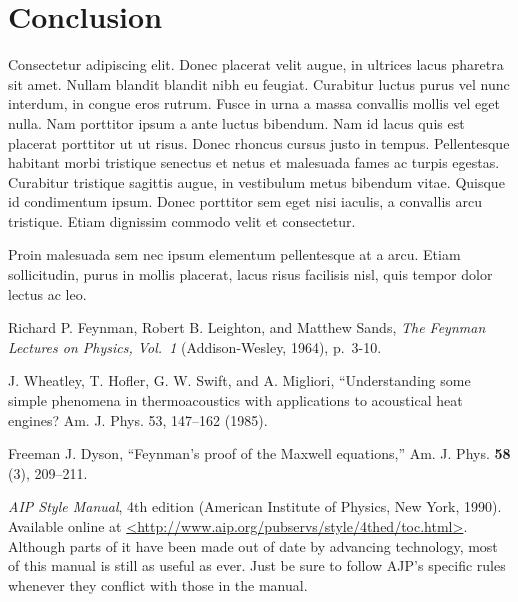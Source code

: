 \documentclass[prb,preprint]{revtex4-1}
\begin{document}
\section{Conclusion}

Consectetur adipiscing elit. Donec placerat velit augue, in ultrices lacus pharetra sit amet. Nullam blandit blandit nibh eu feugiat. Curabitur luctus purus vel nunc interdum, in congue eros rutrum. Fusce in urna a massa convallis mollis vel eget nulla. Nam porttitor ipsum a ante luctus bibendum. Nam id lacus quis est placerat porttitor ut ut risus. Donec rhoncus cursus justo in tempus. Pellentesque habitant morbi tristique senectus et netus et malesuada fames ac turpis egestas. Curabitur tristique sagittis augue, in vestibulum metus bibendum vitae. Quisque id condimentum ipsum. Donec porttitor sem eget nisi iaculis, a convallis arcu tristique. Etiam dignissim commodo velit et consectetur.

\begin{acknowledgments}

Proin malesuada sem nec ipsum elementum pellentesque at a arcu. Etiam sollicitudin, purus in mollis placerat, lacus risus facilisis nisl, quis tempor dolor lectus ac leo.

\end{acknowledgments}


\begin{thebibliography}{99}

 Richard P. Feynman, Robert B. Leighton, and Matthew Sands, 
\textit{The Feynman Lectures on Physics, Vol.\ 1} (Addison-Wesley, 1964), p.~3-10.

 J. Wheatley, T. Hofler, G. W. Swift, and A. Migliori, ``Understanding
some simple phenomena in thermoacoustics with applications to acoustical
heat engines? Am. J. Phys. 53, 147--162 (1985).

 Freeman J. Dyson, ``Feynman's proof of the Maxwell equations,''
Am. J. Phys. \textbf{58} (3), 209--211.  

 \textit{AIP Style Manual}, 4th edition (American 
Institute of Physics, New York, 1990). Available online at 
\url{<http://www.aip.org/pubservs/style/4thed/toc.html>}. Although parts of 
it have been made out of date by advancing technology, most of this manual 
is still as useful as ever. Just be sure to follow AJP's specific rules
whenever they conflict with those in the manual.

\end{thebibliography}
\end{document}
